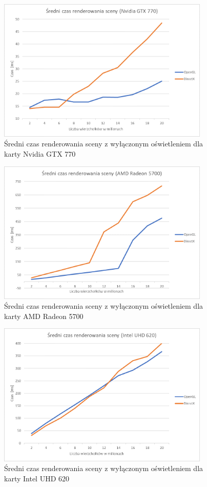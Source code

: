 \documentclass[archive]{mgr}
\begin{document}
 \begin{figure}[h!]
  \centering
    \includegraphics[width=0.9\textwidth]{images/fragoff/1.png}
   \caption{Średni czas renderowania sceny z wyłączonym oświetleniem dla karty Nvidia GTX 770}
   \label{lab:21}
\end{figure}
\newpage

\begin{figure}[h!]
  \centering
    \includegraphics[width=0.9\textwidth]{images/fragoff/2.png}
   \caption{Średni czas renderowania sceny z wyłączonym oświetleniem dla karty AMD Radeon 5700}
   \label{lab:22}
\end{figure}
\bigbreak
\begin{figure}[h!]
  \centering
    \includegraphics[width=0.9\textwidth]{images/fragoff/3.png}
   \caption{Średni czas renderowania sceny z wyłączonym oświetleniem dla karty Intel UHD 620}
   \label{lab:23}
\end{figure}
\newpage
\end{document}
